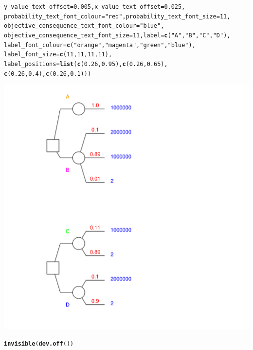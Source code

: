 \documentclass{article}\usepackage[]{graphicx}\usepackage[]{color}
\makeatletter
\newcommand{\hlnum}[1]{\textcolor[rgb]{0.686,0.059,0.569}{#1}}%
\newcommand{\hlstr}[1]{\textcolor[rgb]{0.192,0.494,0.8}{#1}}%
\newcommand{\hlstd}[1]{\textcolor[rgb]{0.345,0.345,0.345}{#1}}%
\newcommand{\hlkwc}[1]{\textcolor[rgb]{0.333,0.667,0.333}{#1}}%
\newcommand{\hlkwd}[1]{\textcolor[rgb]{0.737,0.353,0.396}{\textbf{#1}}}%
\newenvironment{kframe}{%
 \def\at@end@of@kframe{}%
 \ifinner\ifhmode%
  \def\at@end@of@kframe{\end{minipage}}%
  \begin{minipage}{\columnwidth}%
 \fi\fi%
 \def\FrameCommand##1{\hskip\@totalleftmargin \hskip-\fboxsep
 \colorbox{shadecolor}{##1}\hskip-\fboxsep
     \hskip-\linewidth \hskip-\@totalleftmargin \hskip\columnwidth}%
 \MakeFramed {\advance\hsize-\width
   \@totalleftmargin\z@ \linewidth\hsize
   \@setminipage}}%
 {\par\unskip\endMakeFramed%
 \at@end@of@kframe}
\newenvironment{knitrout}{}{} %
\makeatother
\begin{document}
\begin{knitrout}
\begin{kframe}
\begin{alltt}
        \hlkwc{y_value_text_offset}\hlstd{=}\hlnum{0.005}\hlstd{,} \hlkwc{x_value_text_offset}\hlstd{=}\hlnum{0.025}\hlstd{,}
        \hlkwc{probability_text_font_colour}\hlstd{=}\hlstr{"red"}\hlstd{,} \hlkwc{probability_text_font_size}\hlstd{=}\hlnum{11}\hlstd{,}
        \hlkwc{objective_consequence_text_font_colour}\hlstd{=}\hlstr{"blue"}\hlstd{,}
        \hlkwc{objective_consequence_text_font_size}\hlstd{=}\hlnum{11}\hlstd{,} \hlkwc{label}\hlstd{=}\hlkwd{c}\hlstd{(}\hlstr{"A"}\hlstd{,}\hlstr{"B"}\hlstd{,}\hlstr{"C"}\hlstd{,} \hlstr{"D"}\hlstd{),}
        \hlkwc{label_font_colour}\hlstd{=}\hlkwd{c}\hlstd{(}\hlstr{"orange"}\hlstd{,}\hlstr{"magenta"}\hlstd{,}\hlstr{"green"}\hlstd{,}\hlstr{"blue"}\hlstd{),}
        \hlkwc{label_font_size}\hlstd{=}\hlkwd{c}\hlstd{(}\hlnum{11}\hlstd{,}\hlnum{11}\hlstd{,}\hlnum{11}\hlstd{,}\hlnum{11}\hlstd{),}
        \hlkwc{label_positions}\hlstd{=}\hlkwd{list}\hlstd{(}\hlkwd{c}\hlstd{(}\hlnum{0.26}\hlstd{,}\hlnum{0.95}\hlstd{),}\hlkwd{c}\hlstd{(}\hlnum{0.26}\hlstd{,}\hlnum{0.65}\hlstd{),}
                \hlkwd{c}\hlstd{(}\hlnum{0.26}\hlstd{,}\hlnum{0.4}\hlstd{),}\hlkwd{c}\hlstd{(}\hlnum{0.26}\hlstd{,}\hlnum{0.1}\hlstd{)))}
\end{alltt}
\end{kframe}

{\centering \includegraphics[width=0.8\linewidth]{figure/unnamed-chunk-10} 

}


\begin{kframe}\begin{alltt}
\hlkwd{invisible}\hlstd{(}\hlkwd{dev.off}\hlstd{())}
\end{alltt}
\end{kframe}
\end{knitrout}
\end{document}
